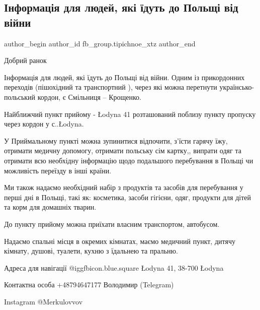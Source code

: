  
 
 
 
 
 
\subsection{Інформація для людей, які їдуть до Польщі від війни}
\label{sec:13_05_2022.fb.fb_group.tipichnoe_xtz.1.info_dlja_ludei_v_polshu}
 
\ifcmt
 author_begin
   author_id fb_group.tipichnoe_xtz
 author_end
\fi

Добрий ранок

Інформація для людей, які їдуть до Польщі від війни.  Одним із прикордонних
переходів (пішохідний та транспортний ), через які можна перетнути
українсько-польський кордон, є Смільниця – Крощенко. 

Найближчий пункт прийому - Łodyna 41 розташований поблизу пункту пропуску через
кордон у с..Łodyna.


У Приймальному пункті можна зупинитися відпочити, з'їсти  гарячу їжу, отримати
медичну допомогу, отримати польську сім картку,, випрати одяг та отримати всю
необхідну інформацію щодо подальшого перебування в Польщі чи можливість
переїзду в інші країни. 

Ми також надаємо необхідний набір з продуктів та засобів для перебування у
перші дні в Польщі, такі як: косметика, засоби гігієни, одяг, продукти для
дітей та корм для домашніх тварин.


До пункту прийому можна приїхати власним транспортом, автобусом.

Надаємо спальні місця в окремих кімнатах, маємо медичний пункт, дитячу кімнату,
душові, туалети, кухню з їдальнею та пральню.

Адреса для навігації  @igg{fbicon.blue.square}  Łodyna 41, 38-700 Łodyna

Контактна особа +48794647177 Володимир (Telegram) 

Instagram @Merkulovvov
